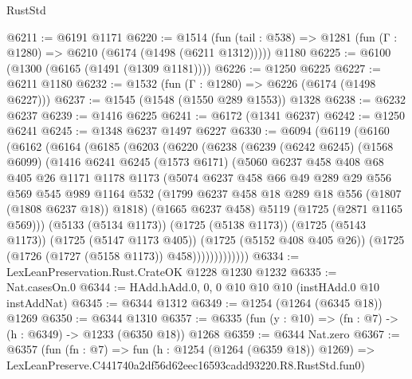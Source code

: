 \begin{lexlean}{RustStd}
\begin{coremodule}
@6211 := @6191 @1171
@6220 := @1514
    (fun (tail : @538) => @1281 (fun (Γ : @1280) => @6210 (@6174 (@1498 (@6211 @1312)))))
    @1180
@6225 := @6100 (@1300 (@6165 (@1491 (@1309 @1181))))
@6226 := @1250 @6225
@6227 := @6211 @1180
@6232 := @1532 (fun (Γ : @1280) => @6226 (@6174 (@1498 @6227)))
@6237 := @1545 (@1548 (@1550 @289 @1553)) @1328
@6238 := @6232 @6237
@6239 := @1416 @6225
@6241 := @6172 (@1341 @6237)
@6242 := @1250 @6241
@6245 := @1348 @6237 @1497 @6227
@6330 := @6094
    (@6119
      (@6160
        (@6162
          (@6164
            (@6185
              (@6203
                (@6220
                  (@6238
                    (@6239
                      (@6242 @6245)
                      (@1568 @6099)
                      (@1416
                        @6241
                        @6245
                        (@1573 @6171)
                        (@5060
                          @6237
                          @458
                          @408
                          @68
                          @405
                          @26
                          @1171
                          @1178
                          @1173
                          (@5074
                            @6237
                            @458
                            @66
                            @49
                            @289
                            @29
                            @556
                            @569
                            @545
                            @989
                            @1164
                            @532
                            (@1799 @6237 @458 @18 @289 @18 @556 (@1807 (@1808 @6237 @18)) @1818)
                            (@1665 @6237 @458)
                            @5119
                            (@1725 (@2871 @1165 @569)))
                          (@5133 (@5134 @1173))
                          (@1725 (@5138 @1173))
                          (@1725 (@5143 @1173))
                          (@1725 (@5147 @1173 @405))
                          (@1725 (@5152 @408 @405 @26))
                          (@1725 (@1726 (@1727 (@5158 @1173)) @458)))))))))))))
@6334 := LexLeanPreservation.Rust.CrateOK @1228 @1230 @1232
@6335 := Nat.casesOn.{0}
@6344 := HAdd.hAdd.{0, 0, 0} @10 @10 @10 (instHAdd.{0} @10 instAddNat)
@6345 := @6344 @1312
@6349 := @1254 (@1264 (@6345 @18)) @1269
@6350 := @6344 @1310
@6357 := @6335 (fun (y : @10) => (fn : @7) -> (h : @6349) -> @1233 (@6350 @18)) @1268
@6359 := @6344 Nat.zero
@6367 := @6357
    (fun (fn : @7) =>
    fun (h : @1254 (@1264 (@6359 @18)) @1269) =>
    LexLeanPreserve.C441740a2df56d62eec16593cadd93220.R8.RustStd.fun0)

\end{coremodule}
\end{lexlean}
